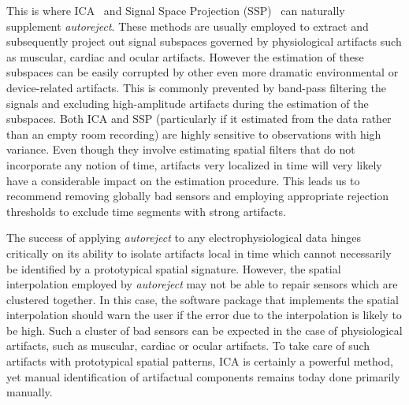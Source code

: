 This is where \ac{ICA}~\citep{vigario1997extraction} and Signal Space Projection (SSP)~\citep{uusitalo1997signal} can naturally supplement \emph{autoreject}. These methods are usually employed to extract and subsequently project out signal subspaces governed by physiological artifacts such as muscular, cardiac and ocular artifacts. However the estimation of these subspaces can be easily corrupted by other even more dramatic environmental or device-related artifacts. This is commonly prevented by band-pass filtering the signals and excluding high-amplitude artifacts during the estimation of the subspaces. Both ICA and SSP (particularly if it estimated from the data rather than an empty room recording) are highly sensitive to observations with high variance. Even though they involve estimating spatial filters that do not incorporate any notion of time, artifacts very localized in time will very likely have a considerable impact on the estimation procedure. This leads us to recommend removing globally bad sensors and employing appropriate rejection thresholds to exclude time segments with strong artifacts. 

The success of applying \emph{autoreject} to any electrophysiological data hinges critically on its ability to isolate artifacts local in time which cannot necessarily be identified by a prototypical spatial signature. However, the spatial interpolation employed by \emph{autoreject} may not be able to repair sensors which are clustered together. In this case, the software package that implements the spatial interpolation should warn the user if the error due to the interpolation is likely to be high. Such a cluster of bad sensors can be expected in the case of physiological artifacts, such as muscular, cardiac or ocular artifacts. To take care of such artifacts with prototypical spatial patterns, ICA is certainly a powerful method, yet manual identification of artifactual components remains today done primarily manually.

